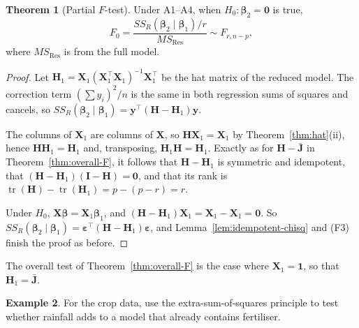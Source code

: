\documentclass[11pt,a4paper]{article}
\numberwithin{equation}{section}
\theoremstyle{definition}
\newtheorem{thm}{Theorem}[subsection]
\newtheorem{exa}[thm]{Example}
\begin{document}
\begin{thm}[Partial $F$-test]\label{thm:partial-F}
Under A1--A4, when $H_0\colon \boldsymbol\beta_2 = \mathbf{0}$ is true,
\[
F_0 = \frac{SS_R(\boldsymbol\beta_2 \mid \boldsymbol\beta_1)/r}{MS_{\mathrm{Res}}} \sim F_{r, n-p},
\]
where $MS_{\mathrm{Res}}$ is from the full model.
\end{thm}

\begin{proof}
Let $\mathbf{H}_1 = \mathbf{X}_1(\mathbf{X}_1^\top\mathbf{X}_1)^{-1}\mathbf{X}_1^\top$ be the
hat matrix of the reduced model. The correction term $\left(\sum y_i\right)^2/n$ is the same in
both regression sums of squares and cancels, so
$SS_R(\boldsymbol\beta_2 \mid \boldsymbol\beta_1) = \mathbf{y}^\top(\mathbf{H} - \mathbf{H}_1)\mathbf{y}$.

The columns of $\mathbf{X}_1$ are columns of $\mathbf{X}$, so $\mathbf{H}\mathbf{X}_1 = \mathbf{X}_1$
by Theorem~\ref{thm:hat}(ii), hence $\mathbf{H}\mathbf{H}_1 = \mathbf{H}_1$ and, transposing,
$\mathbf{H}_1\mathbf{H} = \mathbf{H}_1$. Exactly as for $\mathbf{H} - \bar{\mathbf{J}}$ in
Theorem~\ref{thm:overall-F}, it follows that $\mathbf{H} - \mathbf{H}_1$ is symmetric and
idempotent, that $(\mathbf{H} - \mathbf{H}_1)(\mathbf{I} - \mathbf{H}) = \mathbf{0}$, and that
its rank is $\operatorname{tr}(\mathbf{H}) - \operatorname{tr}(\mathbf{H}_1) = p - (p - r) = r$.

Under $H_0$, $\mathbf{X}\boldsymbol\beta = \mathbf{X}_1\boldsymbol\beta_1$, and
$(\mathbf{H} - \mathbf{H}_1)\mathbf{X}_1 = \mathbf{X}_1 - \mathbf{X}_1 = \mathbf{0}$. So
$SS_R(\boldsymbol\beta_2 \mid \boldsymbol\beta_1) = \boldsymbol\varepsilon^\top(\mathbf{H} - \mathbf{H}_1)\boldsymbol\varepsilon$,
and Lemma~\ref{lem:idempotent-chisq} and (F3) finish the proof as before.
\end{proof}

The overall test of Theorem~\ref{thm:overall-F} is the case where $\mathbf{X}_1 = \mathbf{1}$,
so that $\mathbf{H}_1 = \bar{\mathbf{J}}$.

\begin{exa}\label{exa:crop-partial}
For the crop data, use the extra-sum-of-squares principle to test whether rainfall adds to a
model that already contains fertiliser.
\end{exa}
\end{document}
